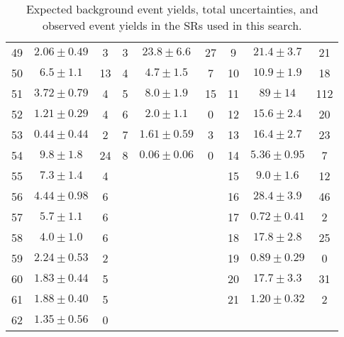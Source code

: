 \begin{table*}[!hbtp]
{\begin{tabular}{ccc|ccc|ccc}
49   &    $2.06\pm0.49 $    &   3   &   3   &    $23.8\pm6.6 $    &   27   &   9   &    $21.4\pm3.7 $    &    21 \\
50   &    $6.5\pm1.1 $    &   13   &   4   &    $4.7\pm1.5 $    &   7   &   10   &    $10.9\pm1.9 $    &    18 \\
51   &    $3.72\pm0.79 $    &   4   &   5   &    $8.0\pm1.9 $    &   15   &   11   &    $89\pm14 $    &    112 \\
52   &    $1.21\pm0.29 $    &   4   &   6   &    $2.0\pm1.1 $    &   0   &   12   &    $15.6\pm2.4 $    &    20 \\
53   &    $0.44\pm0.44 $    &   2   &   7   &    $1.61\pm0.59 $    &   3   &   13   &    $16.4\pm2.7 $    &    23 \\
54   &    $9.8\pm1.8 $    &   24   &   8   &    $0.06\pm0.06 $    &   0   &   14   &    $5.36\pm0.95 $    &    7 \\
55   &    $7.3\pm1.4 $    &   4   &       &       &      &   15   &    $9.0\pm1.6 $    &    12 \\
56   &    $4.44\pm0.98 $    &   6   &       &       &      &   16   &    $28.4\pm3.9 $    &    46 \\
57   &    $5.7\pm1.1 $    &   6   &       &       &      &   17   &    $0.72\pm0.41 $    &    2 \\
58   &    $4.0\pm1.0 $    &   6   &       &       &      &   18   &    $17.8\pm2.8 $    &    25 \\
59   &    $2.24\pm0.53 $    &   2   &       &       &      &   19   &    $0.89\pm0.29 $    &    0 \\
60   &    $1.83\pm0.44 $    &   5   &       &       &      &   20   &    $17.7\pm3.3 $    &    31 \\
61   &    $1.88\pm0.40 $    &   5   &       &       &      &   21   &    $1.20\pm0.32 $    &    2 \\
62   &    $1.35\pm0.56 $    &   0   &       &       &      &      &      &   \\
\hline
\end{tabular}
}
\caption{
Expected background event yields, total uncertainties, and observed event yields in the SRs used in this search.
}
\end{table*}
